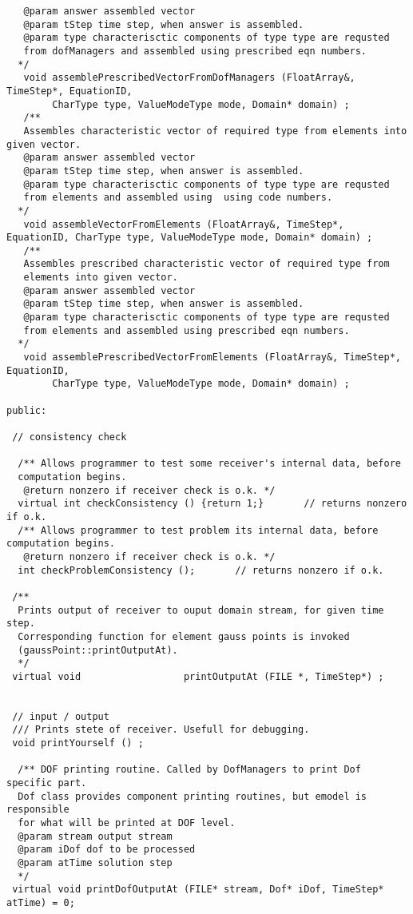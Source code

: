 \documentclass[12pt,draft]{article}
\begin{document}
{\begin{verbatim}
   @param answer assembled vector
   @param tStep time step, when answer is assembled.
   @param type characterisctic components of type type are requsted 
   from dofManagers and assembled using prescribed eqn numbers.
  */
   void assemblePrescribedVectorFromDofManagers (FloatArray&, TimeStep*, EquationID, 
        CharType type, ValueModeType mode, Domain* domain) ;
   /**
   Assembles characteristic vector of required type from elements into given vector.
   @param answer assembled vector
   @param tStep time step, when answer is assembled.
   @param type characterisctic components of type type are requsted 
   from elements and assembled using  using code numbers.
  */
   void assembleVectorFromElements (FloatArray&, TimeStep*, EquationID, CharType type, ValueModeType mode, Domain* domain) ;
   /**
   Assembles prescribed characteristic vector of required type from 
   elements into given vector.
   @param answer assembled vector
   @param tStep time step, when answer is assembled.
   @param type characterisctic components of type type are requsted 
   from elements and assembled using prescribed eqn numbers.
  */
   void assemblePrescribedVectorFromElements (FloatArray&, TimeStep*, EquationID, 
        CharType type, ValueModeType mode, Domain* domain) ;

public:

 // consistency check

  /** Allows programmer to test some receiver's internal data, before
  computation begins.
   @return nonzero if receiver check is o.k. */
  virtual int checkConsistency () {return 1;}       // returns nonzero if o.k.
  /** Allows programmer to test problem its internal data, before computation begins.
   @return nonzero if receiver check is o.k. */
  int checkProblemConsistency ();       // returns nonzero if o.k.

 /** 
  Prints output of receiver to ouput domain stream, for given time step.
  Corresponding function for element gauss points is invoked
  (gaussPoint::printOutputAt).
  */
 virtual void                  printOutputAt (FILE *, TimeStep*) ;


 // input / output
 /// Prints stete of receiver. Usefull for debugging.
 void printYourself () ;

  /** DOF printing routine. Called by DofManagers to print Dof specific part.
  Dof class provides component printing routines, but emodel is responsible
  for what will be printed at DOF level.
  @param stream output stream
  @param iDof dof to be processed
  @param atTime solution step
  */
 virtual void printDofOutputAt (FILE* stream, Dof* iDof, TimeStep* atTime) = 0;



\end{verbatim}}
\end{document}
